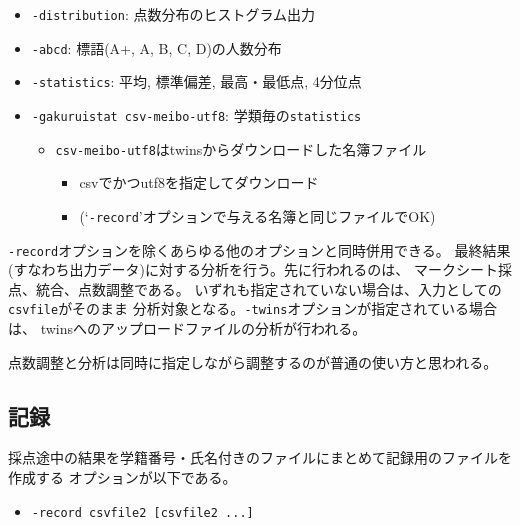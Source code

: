 \begin{itemize}
\item \texttt{-distribution}: 点数分布のヒストグラム出力

\item \texttt{-abcd}: 標語(A+, A, B, C, D)の人数分布

\item \texttt{-statistics}: 平均, 標準偏差, 最高・最低点, 4分位点

\item \texttt{-gakuruistat csv-meibo-utf8}: 学類毎の\texttt{statistics}

\begin{itemize}
\item \texttt{csv-meibo-utf8}はtwinsからダウンロードした名簿ファイル

\begin{itemize}
\item csvでかつutf8を指定してダウンロード

\item (`\texttt{-record}'オプションで与える名簿と同じファイルでOK)

\end{itemize}

\end{itemize}

\end{itemize}

\texttt{-record}オプションを除くあらゆる他のオプションと同時併用できる。
最終結果(すなわち出力データ)に対する分析を行う。先に行われるのは、
マークシート採点、統合、点数調整である。
いずれも指定されていない場合は、入力としての\texttt{csvfile}がそのまま
分析対象となる。\texttt{-twins}オプションが指定されている場合は、
twinsへのアップロードファイルの分析が行われる。

点数調整と分析は同時に指定しながら調整するのが普通の使い方と思われる。

\subsection{記録}
\label{記録}

採点途中の結果を学籍番号・氏名付きのファイルにまとめて記録用のファイルを作成する
オプションが以下である。

\begin{itemize}
\item \texttt{-record csvfile2 [csvfile2 ...]}

\end{itemize}

